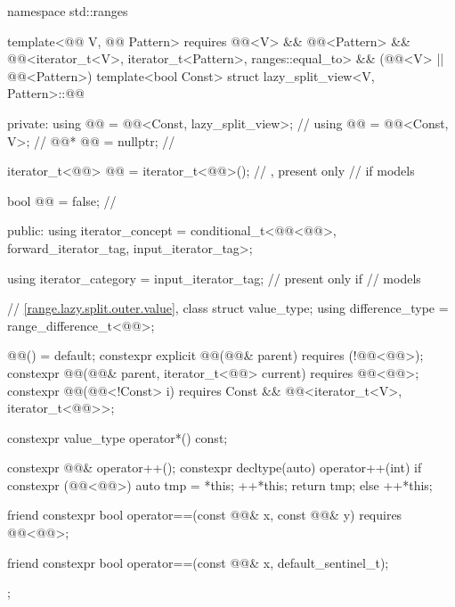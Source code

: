 %
\begin{codeblock}
namespace std::ranges {
  template<@@ V, @@ Pattern>
    requires @@<V> && @@<Pattern> &&
             @@<iterator_t<V>, iterator_t<Pattern>, ranges::equal_to> &&
             (@@<V> || @@<Pattern>)
  template<bool Const>
  struct lazy_split_view<V, Pattern>::@@ {
  private:
    using @@ = @@<Const, lazy_split_view>;     // \expos
    using @@ = @@<Const, V>;                     // \expos
    @@* @@ = nullptr;                              // \expos

    iterator_t<@@> @@ = iterator_t<@@>();         // \expos, present only
                                                            // if  models 

    bool @@ = false;                           // \expos

  public:
    using iterator_concept  =
      conditional_t<@@<@@>, forward_iterator_tag, input_iterator_tag>;

    using iterator_category = input_iterator_tag;           // present only if 
                                                            // models 

    // \ref{range.lazy.split.outer.value}, class 
    struct value_type;
    using difference_type   = range_difference_t<@@>;

    @@() = default;
    constexpr explicit @@(@@& parent)
      requires (!@@<@@>);
    constexpr @@(@@& parent, iterator_t<@@> current)
      requires @@<@@>;
    constexpr @@(@@<!Const> i)
      requires Const && @@<iterator_t<V>, iterator_t<@@>>;

    constexpr value_type operator*() const;

    constexpr @@& operator++();
    constexpr decltype(auto) operator++(int) {
      if constexpr (@@<@@>) {
        auto tmp = *this;
        ++*this;
        return tmp;
      } else
        ++*this;
    }

    friend constexpr bool operator==(const @@& x, const @@& y)
      requires @@<@@>;

    friend constexpr bool operator==(const @@& x, default_sentinel_t);
  };
}
\end{codeblock}

